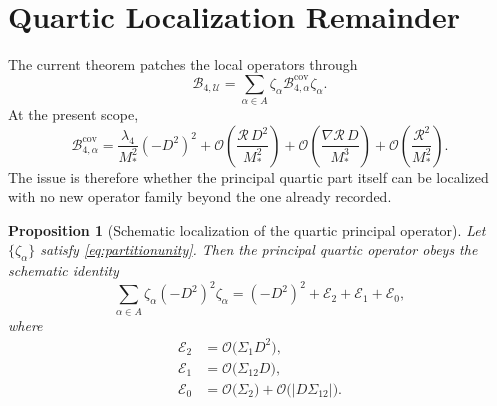 \documentclass[11pt]{article}
\newtheorem{proposition}{Proposition}
\begin{document}
\section{Quartic Localization Remainder}

The current theorem patches the local operators through
\begin{equation}
\mathcal B_{4,\mathcal U}
=
\sum_{\alpha\in A}\zeta_\alpha \mathcal B_{4,\alpha}^{\mathrm{cov}}\zeta_\alpha.
\label{eq:glued}
\end{equation}
At the present scope,
\begin{equation}
\mathcal B_{4,\alpha}^{\mathrm{cov}}
=
\frac{\lambda_4}{M_*^2}(-D^2)^2
+ \mathcal O\!\left(\frac{\mathcal R\,D^2}{M_*^2}\right)
+ \mathcal O\!\left(\frac{\nabla\mathcal R\,D}{M_*^3}\right)
+ \mathcal O\!\left(\frac{\mathcal R^2}{M_*^2}\right).
\label{eq:Balpha}
\end{equation}
The issue is therefore whether the principal quartic part itself can be localized with no new operator family beyond the one already recorded.

\begin{proposition}[Schematic localization of the quartic principal operator]
Let \(\{\zeta_\alpha\}\) satisfy \eqref{eq:partitionunity}. Then the principal quartic operator obeys the schematic identity
\begin{equation}
\sum_{\alpha\in A}\zeta_\alpha (-D^2)^2 \zeta_\alpha
=
(-D^2)^2
+ \mathcal E_2
+ \mathcal E_1
+ \mathcal E_0,
\label{eq:quarticlocalization}
\end{equation}
where
\begin{align}
\mathcal E_2 &= \mathcal O\!\bigl(\Sigma_1 D^2\bigr),
\label{eq:E2}
\\
\mathcal E_1 &= \mathcal O\!\bigl(\Sigma_{12} D\bigr),
\label{eq:E1}
\\
\mathcal E_0 &= \mathcal O\!\bigl(\Sigma_2\bigr) + \mathcal O\!\bigl(|D\Sigma_{12}|\bigr).
\label{eq:E0}
\end{align}
\end{proposition}
\end{document}
